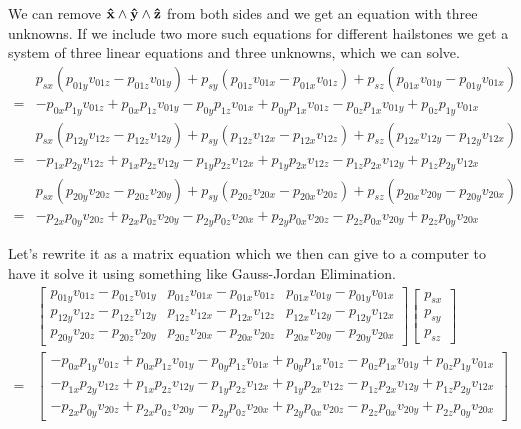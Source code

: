 \documentclass[11pt]{article}
\newcommand{\uvecx}{{\mathbf{\hat{\textnormal{\bfseries x}}}}}
\newcommand{\uvecy}{{\mathbf{\hat{\textnormal{\bfseries y}}}}}
\newcommand{\uvecz}{{\mathbf{\hat{\textnormal{\bfseries z}}}}}
\begin{document}
We can remove $\uvecx \wedge \uvecy \wedge \uvecz$ from both sides and we get an equation with three unknowns.
If we include two more such equations for different hailstones we get a system of three linear equations
and three unknowns, which we can solve.
\begin{align}
    & p_{sx}(p_{01y}v_{01z} - p_{01z}v_{01y}) + p_{sy}(p_{01z}v_{01x} - p_{01x}v_{01z}) + p_{sz}(p_{01x}v_{01y} - p_{01y}v_{01x}) \nonumber \\
  = &-p_{0x}p_{1y}v_{01z} + p_{0x}p_{1z}v_{01y} - p_{0y}p_{1z}v_{01x} + p_{0y}p_{1x}v_{01z} - p_{0z}p_{1x}v_{01y} + p_{0z}p_{1y}v_{01x} \nonumber \\
    & p_{sx}(p_{12y}v_{12z} - p_{12z}v_{12y}) + p_{sy}(p_{12z}v_{12x} - p_{12x}v_{12z}) + p_{sz}(p_{12x}v_{12y} - p_{12y}v_{12x}) \nonumber \\
  = &-p_{1x}p_{2y}v_{12z} + p_{1x}p_{2z}v_{12y} - p_{1y}p_{2z}v_{12x} + p_{1y}p_{2x}v_{12z} - p_{1z}p_{2x}v_{12y} + p_{1z}p_{2y}v_{12x} \nonumber \\
    & p_{sx}(p_{20y}v_{20z} - p_{20z}v_{20y}) + p_{sy}(p_{20z}v_{20x} - p_{20x}v_{20z}) + p_{sz}(p_{20x}v_{20y} - p_{20y}v_{20x}) \nonumber \\
  = &-p_{2x}p_{0y}v_{20z} + p_{2x}p_{0z}v_{20y} - p_{2y}p_{0z}v_{20x} + p_{2y}p_{0x}v_{20z} - p_{2z}p_{0x}v_{20y} + p_{2z}p_{0y}v_{20x} \nonumber
\end{align}

Let's rewrite it as a matrix equation which we then can give to a computer to have it solve it using
something like Gauss-Jordan Elimination.
\begin{align}
    &\begin{bmatrix}
        p_{01y}v_{01z} - p_{01z}v_{01y} & p_{01z}v_{01x} - p_{01x}v_{01z} & p_{01x}v_{01y} - p_{01y}v_{01x} \\
        p_{12y}v_{12z} - p_{12z}v_{12y} & p_{12z}v_{12x} - p_{12x}v_{12z} & p_{12x}v_{12y} - p_{12y}v_{12x} \\
        p_{20y}v_{20z} - p_{20z}v_{20y} & p_{20z}v_{20x} - p_{20x}v_{20z} & p_{20x}v_{20y} - p_{20y}v_{20x}
    \end{bmatrix}
    \begin{bmatrix}
        p_{sx} \\
        p_{sy} \\
        p_{sz}
    \end{bmatrix} \nonumber \\
    =
    &\begin{bmatrix}
        -p_{0x}p_{1y}v_{01z} + p_{0x}p_{1z}v_{01y} - p_{0y}p_{1z}v_{01x} + p_{0y}p_{1x}v_{01z} - p_{0z}p_{1x}v_{01y} + p_{0z}p_{1y}v_{01x} \\
        -p_{1x}p_{2y}v_{12z} + p_{1x}p_{2z}v_{12y} - p_{1y}p_{2z}v_{12x} + p_{1y}p_{2x}v_{12z} - p_{1z}p_{2x}v_{12y} + p_{1z}p_{2y}v_{12x} \\
        -p_{2x}p_{0y}v_{20z} + p_{2x}p_{0z}v_{20y} - p_{2y}p_{0z}v_{20x} + p_{2y}p_{0x}v_{20z} - p_{2z}p_{0x}v_{20y} + p_{2z}p_{0y}v_{20x} \nonumber
    \end{bmatrix}
\end{align}
\end{document}
